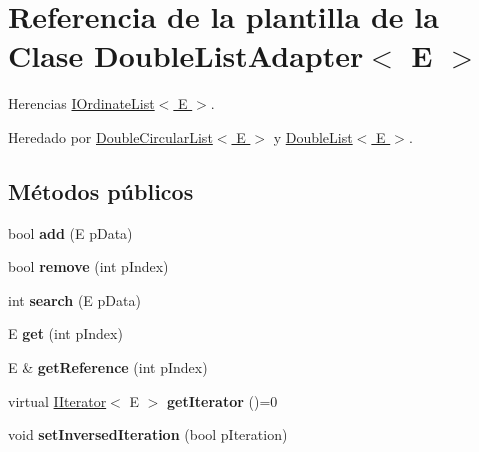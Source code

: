 \hypertarget{classDoubleListAdapter}{\section{Referencia de la plantilla de la Clase Double\-List\-Adapter$<$ E $>$}
\label{classDoubleListAdapter}
}


Herencias \hyperlink{classIOrdinateList}{I\-Ordinate\-List$<$ E $>$}.



Heredado por \hyperlink{classDoubleCircularList}{Double\-Circular\-List$<$ E $>$} y \hyperlink{classDoubleList}{Double\-List$<$ E $>$}.

\subsection*{Métodos públicos}
\begin{DoxyCompactItemize}
\item 
\hypertarget{classDoubleListAdapter_a6f5bc523f04b3b223f259a72a1975b11}{bool {\bfseries add} (E p\-Data)}\label{classDoubleListAdapter_a6f5bc523f04b3b223f259a72a1975b11}

\item 
\hypertarget{classDoubleListAdapter_a76d83f0f676236b98aa5e555a43a173b}{bool {\bfseries remove} (int p\-Index)}\label{classDoubleListAdapter_a76d83f0f676236b98aa5e555a43a173b}

\item 
\hypertarget{classDoubleListAdapter_a849368822d881d40c8a65dc25b45376e}{int {\bfseries search} (E p\-Data)}\label{classDoubleListAdapter_a849368822d881d40c8a65dc25b45376e}

\item 
\hypertarget{classDoubleListAdapter_a70017142377b23a0f6ec22ac4c01aa6c}{E {\bfseries get} (int p\-Index)}\label{classDoubleListAdapter_a70017142377b23a0f6ec22ac4c01aa6c}

\item 
\hypertarget{classDoubleListAdapter_ad608ef5f6917c09899b55fc5b20d9b4b}{E \& {\bfseries get\-Reference} (int p\-Index)}\label{classDoubleListAdapter_ad608ef5f6917c09899b55fc5b20d9b4b}

\item 
\hypertarget{classDoubleListAdapter_ad2e5fc26e7e75e45e10a0ddf35b4a64d}{virtual \hyperlink{classIIterator}{I\-Iterator}$<$ E $>$ {\bfseries get\-Iterator} ()=0}\label{classDoubleListAdapter_ad2e5fc26e7e75e45e10a0ddf35b4a64d}

\item 
\hypertarget{classDoubleListAdapter_a95df61b73f8c9535c8abe227c2207ea9}{void {\bfseries set\-Inversed\-Iteration} (bool p\-Iteration)}\label{classDoubleListAdapter_a95df61b73f8c9535c8abe227c2207ea9}

\end{DoxyCompactItemize}
